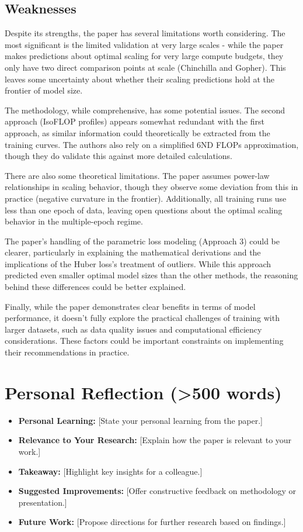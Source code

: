 \documentclass{article}
\begin{document}
\subsection{Weaknesses}
Despite its strengths, the paper has several limitations worth considering. The most significant is the limited validation at very large scales - while the paper makes predictions about optimal scaling for very large compute budgets, they only have two direct comparison points at scale (Chinchilla and Gopher). This leaves some uncertainty about whether their scaling predictions hold at the frontier of model size.

The methodology, while comprehensive, has some potential issues. The second approach (IsoFLOP profiles) appears somewhat redundant with the first approach, as similar information could theoretically be extracted from the training curves. The authors also rely on a simplified 6ND FLOPs approximation, though they do validate this against more detailed calculations.

There are also some theoretical limitations. The paper assumes power-law relationships in scaling behavior, though they observe some deviation from this in practice (negative curvature in the frontier). Additionally, all training runs use less than one epoch of data, leaving open questions about the optimal scaling behavior in the multiple-epoch regime.

The paper's handling of the parametric loss modeling (Approach 3) could be clearer, particularly in explaining the mathematical derivations and the implications of the Huber loss's treatment of outliers. While this approach predicted even smaller optimal model sizes than the other methods, the reasoning behind these differences could be better explained.

Finally, while the paper demonstrates clear benefits in terms of model performance, it doesn't fully explore the practical challenges of training with larger datasets, such as data quality issues and computational efficiency considerations. These factors could be important constraints on implementing their recommendations in practice.


\section*{Personal Reflection (>500 words)}
\vspace{-0.5em}
\begin{itemize}
    \item \textbf{Personal Learning:} [State your personal learning from the paper.]
    \item \textbf{Relevance to Your Research:} [Explain how the paper is relevant to your work.]
    \item \textbf{Takeaway:} [Highlight key insights for a colleague.]
    \item \textbf{Suggested Improvements:} [Offer constructive feedback on methodology or presentation.]
    \item \textbf{Future Work:} [Propose directions for further research based on findings.]
\end{itemize}
\end{document}
